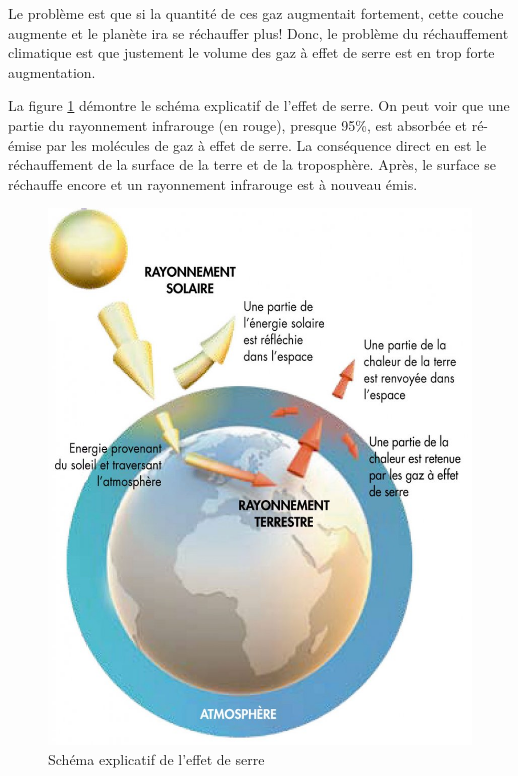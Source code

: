 \documentclass[a4paper,11pt]{article}
\begin{document}
Le problème est que si la quantité de ces gaz augmentait fortement, cette couche
augmente et le planète ira se réchauffer plus! 
Donc, le problème du réchauffement climatique est que justement le volume des gaz à effet de serre est en trop forte augmentation.


La figure \ref{fig:effetserre} démontre le schéma explicatif de l'effet de serre.
On peut voir que une partie du rayonnement infrarouge (en rouge), presque 95\%, est absorbée et ré-émise par les molécules
de gaz  à effet de serre.  La conséquence direct  en est le réchauffement  de la
surface de la terre et de la troposphère. Après, le surface se réchauffe encore et un
rayonnement infrarouge est à nouveau émis. 

\begin{figure}[H]
  \begin{centering}
    \includegraphics[scale=0.3]{fig/effet-de-serre}
    \par\end{centering}
  \caption{Schéma explicatif de l'effet de serre}
  \label{fig:effetserre}
\end{figure}
\end{document}

